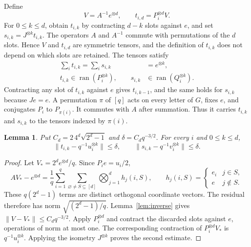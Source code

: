 \documentclass[11pt]{amsart}
\newtheorem{lemma}[theorem]{Lemma}
\newcommand{\ran}{\operatorname{ran}}
\begin{document}
Define
\begin{equation}\label{eq:tensors}
V=A^{-1}e^{\otimes d},\qquad t_{i,d}=P_i^{\otimes d}V.
\end{equation}
For $0\leq k\leq d$, obtain $t_{i,k}$ by contracting $d-k$ slots against $e$,
and set $s_{i,k}=J^{\otimes k}t_{i,k}$. The operators $A$ and $A^{-1}$ commute
with permutations of the $d$ slots. Hence $V$ and $t_{i,d}$ are symmetric
tensors, and the definition of $t_{i,k}$ does not depend on which slots are
retained. The tensors satisfy
\begin{align}
\sum_i t_{i,k}=\sum_i s_{i,k}&=e^{\otimes k},\label{eq:sum}\\
t_{i,k}\in\ran(P_i^{\otimes k}),\qquad
s_{i,k}&\in\ran(Q_i^{\otimes k}).\label{eq:range}
\end{align}
Contracting any slot of $t_{i,k}$ against $e$ gives $t_{i,k-1}$, and the same
holds for $s_{i,k}$ because $Je=e$. A permutation $\pi$ of $[q]$ acts on every
letter of $G$, fixes $e$, and conjugates $P_i$ to $P_{\pi(i)}$. It commutes
with $A$ after summation. Thus it carries $t_{i,k}$ and $s_{i,k}$ to the tensors
indexed by $\pi(i)$.

\begin{lemma}\label{lem:approximation}
Put $C_d=2\,4^d\sqrt{2^d-1}$ and $\delta=C_dq^{-3/2}$. For every $i$ and
$0\leq k\leq d$,
\begin{equation}\label{eq:approximation}
\|t_{i,k}-q^{-1}u_i^{\otimes k}\|\leq\delta,\qquad
\|s_{i,k}-q^{-1}v_i^{\otimes k}\|\leq\delta.
\end{equation}
\end{lemma}

\begin{proof}
Let $V_*=2^de^{\otimes d}/q$. Since $P_i e=u_i/2$,
\[
AV_*-e^{\otimes d}
=\frac1q\sum_{i=1}^q\sum_{\varnothing\ne S\subseteq[d]}
\bigotimes_{j=1}^d h_j(i,S),\qquad
h_j(i,S)=\begin{cases}e_i&j\in S,\\e&j\notin S.\end{cases}
\]
These $q(2^d-1)$ terms are distinct orthogonal coordinate vectors. The residual
therefore has norm $\sqrt{(2^d-1)/q}$. Lemma~\ref{lem:inverse} gives
$\|V-V_*\|\leq C_dq^{-3/2}$. Apply $P_i^{\otimes d}$ and contract the
discarded slots against $e$, operations of norm at most one. The corresponding
contraction of $P_i^{\otimes d}V_*$ is $q^{-1}u_i^{\otimes k}$. Applying the
isometry $J^{\otimes k}$ proves the second estimate.
\end{proof}
\end{document}
